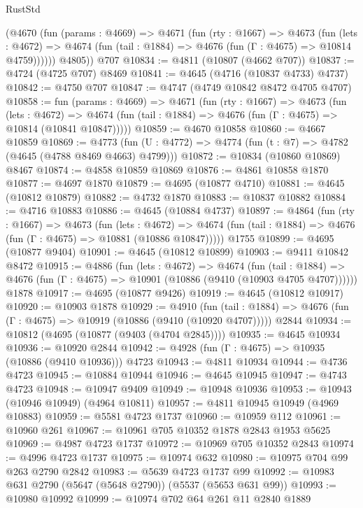 \begin{lexlean}{RustStd}
\begin{coremodule}
        (@4670
          (fun (params : @4669) =>
          @4671
            (fun (rty : @1667) =>
            @4673
              (fun (lets : @4672) =>
              @4674 (fun (tail : @1884) => @4676 (fun (Γ : @4675) => @10814 @4759))))))
        @4805))
    @707
@10834 := @4811 (@10807 (@4662 @707))
@10837 := @4724 (@4725 @707) @8469
@10841 := @4645 (@4716 (@10837 @4733) @4737)
@10842 := @4750 @707
@10847 := @4747 (@4749 @10842 @8472 @4705 @4707)
@10858 := fun (params : @4669) =>
  @4671
    (fun (rty : @1667) =>
    @4673
      (fun (lets : @4672) =>
      @4674 (fun (tail : @1884) => @4676 (fun (Γ : @4675) => @10814 (@10841 @10847)))))
@10859 := @4670 @10858
@10860 := @4667 @10859
@10869 := @4773 (fun (U : @4772) => @4774 (fun (t : @7) => @4782 (@4645 (@4788 @8469 @4663) @4799)))
@10872 := @10834 (@10860 @10869) @8467
@10874 := @4858 @10859 @10869
@10876 := @4861 @10858 @1870
@10877 := @4697 @1870
@10879 := @4695 (@10877 @4710)
@10881 := @4645 (@10812 @10879)
@10882 := @4732 @1870
@10883 := @10837 @10882
@10884 := @4716 @10883
@10886 := @4645 (@10884 @4737)
@10897 := @4864
    (fun (rty : @1667) =>
    @4673
      (fun (lets : @4672) =>
      @4674 (fun (tail : @1884) => @4676 (fun (Γ : @4675) => @10881 (@10886 @10847)))))
    @1755
@10899 := @4695 (@10877 @9404)
@10901 := @4645 (@10812 @10899)
@10903 := @9411 @10842 @8472
@10915 := @4886
    (fun (lets : @4672) =>
    @4674
      (fun (tail : @1884) =>
      @4676 (fun (Γ : @4675) => @10901 (@10886 (@9410 (@10903 @4705 @4707))))))
    @1878
@10917 := @4695 (@10877 @9426)
@10919 := @4645 (@10812 @10917)
@10920 := @10903 @1878
@10929 := @4910
    (fun (tail : @1884) => @4676 (fun (Γ : @4675) => @10919 (@10886 (@9410 (@10920 @4707)))))
    @2844
@10934 := @10812 (@4695 (@10877 (@9403 (@4704 @2845))))
@10935 := @4645 @10934
@10936 := @10920 @2844
@10942 := @4928 (fun (Γ : @4675) => @10935 (@10886 (@9410 @10936))) @4723
@10943 := @4811 @10934
@10944 := @4736 @4723
@10945 := @10884 @10944
@10946 := @4645 @10945
@10947 := @4743 @4723
@10948 := @10947 @9409
@10949 := @10948 @10936
@10953 := @10943 (@10946 @10949) (@4964 @10811)
@10957 := @4811 @10945 @10949 (@4969 @10883)
@10959 := @5581 @4723 @1737
@10960 := @10959 @112
@10961 := @10960 @261
@10967 := @10961 @705 @10352 @1878 @2843 @1953 @5625
@10969 := @4987 @4723 @1737
@10972 := @10969 @705 @10352 @2843
@10974 := @4996 @4723 @1737
@10975 := @10974 @632
@10980 := @10975 @704 @99 @263 @2790 @2842
@10983 := @5639 @4723 @1737 @99
@10992 := @10983 @631 @2790 (@5647 (@5648 @2790)) (@5537 (@5653 @631 @99))
@10993 := @10980 @10992
@10999 := @10974 @702 @64 @261 @11 @2840 @1889

\end{coremodule}
\end{lexlean}
